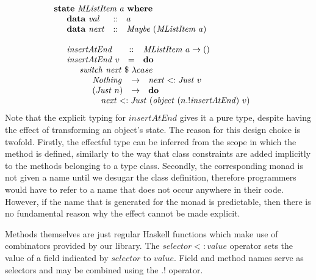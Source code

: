 \begin{displaymath}
\begin{array}{l}
\mathbf{state}~\mathit{MListItem}~a~\mathbf{where} \\
\quad \begin{array}{lcl}
\mathbf{data}~\mathit{val} & :: & a \\
\mathbf{data}~\mathit{next}  & :: & \mathit{Maybe}~(\mathit{MListItem}~a)
\end{array}\\\\
\quad \begin{array}{lcl}
\mathit{insertAtEnd} & :: & \mathit{MListItem}~a \to ()\\
\mathit{insertAtEnd}~v & = & \mathbf{do} \\
\multicolumn{3}{l}{\quad \begin{array}{l}
    \mathit{switch}~\mathit{next}~\$~\lambda case \\
    \quad \begin{array}{lcl}
        \mathit{Nothing} & \to & \mathit{next} <: \mathit{Just}~v  \\
        (\mathit{Just}~n) & \to & \mathbf{do} \\
            \multicolumn{3}{l}{\quad \mathit{next} <: \mathit{Just}~(\mathit{object}~(n.!\mathit{insertAtEnd})~v) }
    \end{array}
    \end{array}}
\end{array}
\end{array}
\end{displaymath}
Note that the explicit typing for $\mathit{insertAtEnd}$ gives it a pure type, despite having the effect of transforming an object's state. The reason for this design choice is twofold. Firstly, the effectful type can be inferred from the scope in which the method is defined, similarly to the way that class constraints are added implicitly to the methods belonging to a type class. Secondly, the corresponding monad is not given a name until we desugar the class definition, therefore programmers would have to refer to a name that does not occur anywhere in their code. However, if the name that is generated for the monad is predictable, then there is no fundamental reason why the effect cannot be made explicit.

Methods themselves are just regular Haskell functions which make use of combinators provided by our library. The $\mathit{selector} <: \mathit{value}$ operator sets the value of a field indicated by $\mathit{selector}$ to $\mathit{value}$. Field and method names serve as selectors and may be combined using the $.!$ operator. 

